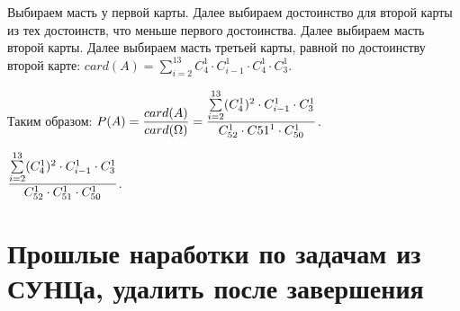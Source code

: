 \documentclass{article}
\begin{document}
\begin{enumerate}
    Выбираем масть у первой карты. Далее выбираем достоинство для второй карты из тех достоинств, что меньше первого достоинства. Далее выбираем масть второй карты. Далее выбираем масть третьей карты, равной по достоинству второй карте: $card(A) = \sum\limits_{i = 2}^{13}  C_4^1 \cdot C_{i - 1}^1 \cdot C_4^1 \cdot C_3^1$.

    Таким образом: $\displaystyle{P(A) = \frac{card(A)}{card(\Omega)} = \frac{\sum\limits_{i = 2}^{13}  (C_4^1) ^ 2 \cdot C_{i - 1}^1 \cdot C_3^1}{C_{52}^1 \cdot C{51}^1 \cdot C_{50}^1}}$.
    
    \answer{} $\displaystyle{\frac{\sum\limits_{i = 2}^{13}  (C_4^1) ^ 2 \cdot C_{i - 1}^1 \cdot C_3^1}{C_{52}^1 \cdot C_{51}^1 \cdot C_{50}^1}}$.
\end{enumerate}

\section*{Прошлые наработки по задачам из СУНЦа, удалить после завершения}
























 
	
\end{document}
